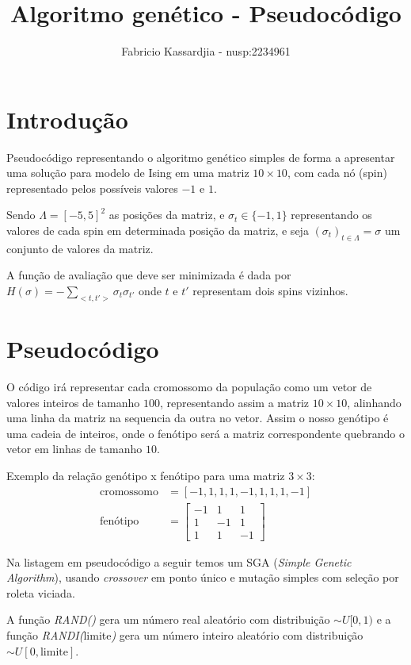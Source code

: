 \documentclass[]{article}
\title{Algoritmo genético - Pseudocódigo}
\author{Fabricio Kassardjia - nusp:2234961}
\begin{document}

\maketitle

\section{Introdução}
Pseudocódigo representando o algoritmo genético simples de forma a apresentar uma solução para modelo de Ising em uma matriz $10 \times 10$, com cada nó (spin) representado pelos possíveis valores $-1$ e $1$. 

Sendo $\Lambda = \left[-5,5\right]^2$ as posições da matriz, e $\sigma_t \in \{-1,1\}$ representando os valores de cada spin em determinada posição da matriz, e seja $(\sigma_t)_{t \in \Lambda} = \sigma$ um conjunto de valores da matriz. 

A função de avaliação que deve ser minimizada é dada por $H(\sigma) = -\sum_{<t,t'>}\sigma_t \sigma_{t'}$ onde $t$ e $t'$ representam dois spins vizinhos.   

\section{Pseudocódigo}
O código irá representar cada cromossomo da população como um vetor de valores inteiros de tamanho $100$, representando assim a matriz $10 \times 10$, alinhando uma linha da matriz na sequencia da outra no vetor. Assim o nosso genótipo é uma cadeia de inteiros, onde o fenótipo será a matriz correspondente quebrando o vetor em linhas de tamanho $10$.

Exemplo da relação genótipo x fenótipo para uma matriz $3 \times 3$:
\begin{align*}
\text{cromossomo} &= \left[-1, 1, 1, 1, -1, 1, 1, 1, -1 \right]\\
\text{fenótipo} &= \begin{bmatrix}
					-1 & 1 & 1 \\
					1 & -1 & 1 \\
					1 & 1 & -1
					\end{bmatrix}
\end{align*}

Na listagem em pseudocódigo a seguir temos um SGA (\textit{Simple Genetic Algorithm}), usando \textit{crossover} em ponto único e mutação simples com seleção por roleta viciada.

A função \textit{RAND()} gera um número real aleatório com distribuição $\sim U[0,1)$ e a função \textit{RANDI(}limite\textit{)} gera um número inteiro aleatório com distribuição $\sim U[0,\text{limite}]$.
\end{document}
